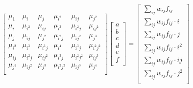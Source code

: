 \documentclass[aps,11pt]{revtex4}
\begin{document}
\begin{equation}
\displaystyle
	\begin{bmatrix}
		\mu_1     & \mu_{i} & \mu_{j} & \mu_{i^2} & \mu_{ij} & \mu_{j^2}\\
		\mu_i     & \mu_{i^2} & \mu_{ij} & \mu_{i^3} & \mu_{i^2j} & \mu_{ij^2}\\
		\mu_j     & \mu_{ij} & \mu_{j^2} & \mu_{i^2j} & \mu_{ij^2} & \mu_{j^3}\\
		\mu_{i^2} & \mu_{i^3} & \mu_{i^3j} & \mu_{i^4} & \mu_{i^3j} & \mu_{i^2j^2}\\
		\mu_{ij}  & \mu_{i^2j} & \mu_{ij^2} & \mu_{i^3j} & \mu_{i^2j^2} & \mu_{ij^3}\\
		\mu_{j^2} & \mu_{ij^2} & \mu_{j^3} & \mu_{i^2j^2} & \mu_{ij^3} & \mu_{j^4}\\
	\end{bmatrix}
	\begin{bmatrix}
	a\\
	b\\
	c\\
	d\\
	e\\
	f\\
	\end{bmatrix}
	=
\begin{bmatrix}
	\sum_{ij} w_{ij} f_{ij}        \\
	\sum_{ij} w_{ij} f_{ij} \cdot i\\
	\sum_{ij} w_{ij} f_{ij} \cdot j\\
	\sum_{ij} w_{ij} f_{ij} \cdot i^2\\
	\sum_{ij} w_{ij} f_{ij} \cdot ij\\
	\sum_{ij} w_{ij} f_{ij} \cdot j^2\\
\end{bmatrix}
\end{equation}
\end{document}
